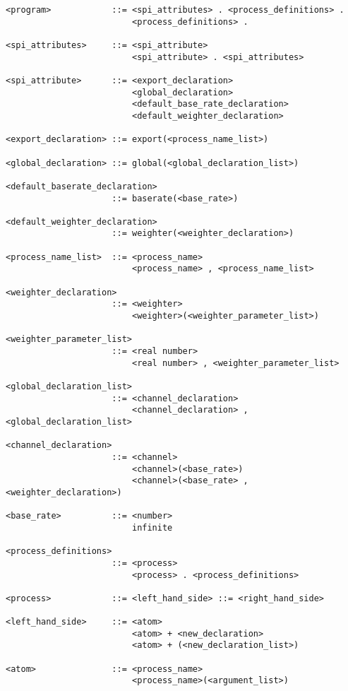 \begin{verbatim}
<program>            ::= <spi_attributes> . <process_definitions> .
                         <process_definitions> .

<spi_attributes>     ::= <spi_attribute>
                         <spi_attribute> . <spi_attributes>

<spi_attribute>      ::= <export_declaration>
                         <global_declaration>
                         <default_base_rate_declaration>
                         <default_weighter_declaration>

<export_declaration> ::= export(<process_name_list>)

<global_declaration> ::= global(<global_declaration_list>)

<default_baserate_declaration>
                     ::= baserate(<base_rate>)

<default_weighter_declaration>
                     ::= weighter(<weighter_declaration>)

<process_name_list>  ::= <process_name>
                         <process_name> , <process_name_list>

<weighter_declaration>
                     ::= <weighter>
                         <weighter>(<weighter_parameter_list>)

<weighter_parameter_list>
                     ::= <real number>
                         <real number> , <weighter_parameter_list>

<global_declaration_list>
                     ::= <channel_declaration>
                         <channel_declaration> , <global_declaration_list>

<channel_declaration>
                     ::= <channel>
                         <channel>(<base_rate>)
                         <channel>(<base_rate> , <weighter_declaration>)

<base_rate>          ::= <number>
                         infinite

<process_definitions>
                     ::= <process>
                         <process> . <process_definitions>

<process>            ::= <left_hand_side> ::= <right_hand_side>

<left_hand_side>     ::= <atom>
                         <atom> + <new_declaration>
                         <atom> + (<new_declaration_list>)

<atom>               ::= <process_name>
                         <process_name>(<argument_list>)


\end{verbatim}
